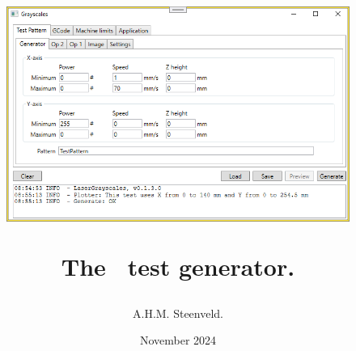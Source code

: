 \documentclass[a4paper,10pt,oneside]{book}
\author{A.H.M. Steenveld.}
\title{
    \begin{figure}[h!]
        \centering
        \includegraphics[width=0.8\linewidth]{./images/Grayscales-v0.1.3.png}
    \end{figure}
    The \GS\ test generator.
}
\date{November 2024}
\begin{document}
    \maketitle\frontmatter\maketitle%
    
    \tableofcontents\mainmatter%
    
    
    
\begin{appendices}
    
    
    
\end{appendices}\backmatter%
    \clearpage{}\printindex
\end{document}
